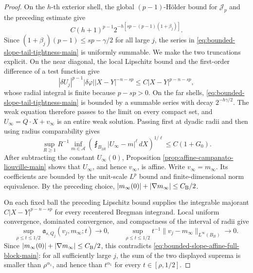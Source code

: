 \documentclass[11pt,reqno]{amsart}
\numberwithin{equation}{section}
\newcommand{\Jp}{\mathcal J_p}
\newcommand{\dd}{\,d}
\theoremstyle{remark}
\begin{document}
\begin{proof}
On the \(h\)-th exterior shell, the global \((p-1)\)-H\"older bound for
\(\Jp\) and the preceding estimate give
\begin{equation}
 C(h+1)^{p-1}2^{-h[sp-(p-1)(1+\beta_j)]}.
 \label{eq:bounded-slope-tail-tightness-main}
\end{equation}
Since \((1+\beta_j)(p-1)\le sp-\gamma/2\) for all large \(j\), the
series in \eqref{eq:bounded-slope-tail-tightness-main} is uniformly
summable.  We make the two truncations explicit.  On the near
diagonal, the local Lipschitz bound and the first-order difference of a
test function give
\[
 |\delta U_j|^{p-1}|\delta\varphi|
 |X-Y|^{-n-sp}
 \le C|X-Y|^{p-n-sp},
\]
whose radial integral is finite because \(p-sp>0\).  On the far
shells, \eqref{eq:bounded-slope-tail-tightness-main} is bounded by a
summable series with decay \(2^{-h\gamma/2}\).  The weak equation
therefore passes to the limit on every compact set, and
\(U_\infty=Q\cdot X+v_\infty\) is an entire weak solution.  Passing
first at dyadic radii and then
using radius comparability gives
\begin{equation*}
 \sup_{R\ge1}R^{-1}
 \inf_{m\in\mathcal A}
 \left(\fint_{B_{2R}}|U_\infty-m|^\ell\dd X\right)^{1/\ell}
 \le C(1+G_0).
\end{equation*}
After subtracting the constant \(U_\infty(0)\), Proposition
\ref{prop:affine-campanato-liouville-main} shows that \(U_\infty\), and
hence \(v_\infty\), is affine.  Write \(v_\infty=m_\infty\).  Its
coefficients are bounded by the unit-scale \(L^p\) bound and
finite-dimensional norm equivalence.  By the preceding choice,
\(|m_\infty(0)|+|\nabla m_\infty|\le C_{\rm B}/2\).

On each fixed ball the preceding Lipschitz bound supplies the integrable
majorant \(C|X-Y|^{p-n-sp}\) for every recentered Bregman integrand.
Local uniform convergence, dominated convergence, and compactness of the
interval of radii give
\begin{equation*}
 \sup_{\rho\le t\le1/2}
 \mathfrak a_{s,Q_j}(v_j,m_\infty;t)\longrightarrow0,
 \qquad
 \sup_{\rho\le t\le1/2}t^{-1}
 \|v_j-m_\infty\|_{L^\infty(B_{2t})}\longrightarrow0.
\end{equation*}
Since \(|m_\infty(0)|+|\nabla m_\infty|\le C_{\rm B}/2\), this
contradicts \eqref{eq:bounded-slope-affine-full-block-main}: for all
sufficiently large \(j\), the sum of the two displayed suprema is
smaller than \(\rho^{\alpha_1}\), and hence than \(t^{\alpha_1}\) for every
\(t\in[\rho,1/2]\).
\end{proof}
\end{document}
